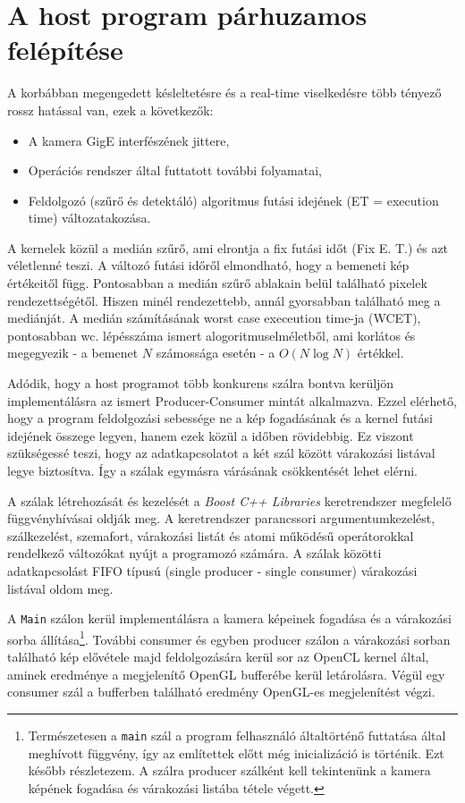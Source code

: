 \section{A host program párhuzamos felépítése} \label{sec:parallel}
	A korbábban megengedett késleltetésre és a real-time viselkedésre több tényező rossz hatással van, ezek a következők:
	\begin{itemize}[noitemsep]
	  \item A kamera GigE interfészének jittere,
	  \item Operációs rendszer által futtatott további folyamatai,
	  \item Feldolgozó (szűrő és detektáló) algoritmus futási idejének (ET = execution time) változatakozása. 
	\end{itemize}
	A kernelek közül a medián szűrő, ami elrontja a fix futási időt (Fix E. T.) és azt véletlenné teszi.
	A változó futási időről elmondható, hogy a bemeneti kép értékeitől függ. Pontosabban a medián szűrő ablakain belül található
	pixelek rendezettségétől. Hiszen minél rendezettebb, annál gyorsabban található meg a mediánját.
	A medián számításának worst case execeution time-ja (WCET), pontosabban wc. lépésszáma ismert alogoritmuselméletből, ami korlátos
	és megegyezik - a bemenet $N$ számossága esetén - a $O(N \log N)$  értékkel.
	
	Adódik, hogy a host programot több konkurens szálra bontva kerüljön implementálásra az ismert Producer-Consumer
	\cite{EWD:EWD329pub} mintát alkalmazva. Ezzel elérhető, hogy a program feldolgozási sebessége ne a kép fogadásának és a kernel
	futási idejének összege legyen, hanem ezek közül a időben rövidebbig.
	Ez viszont szükségessé teszi, hogy az adatkapcsolatot a két szál között várakozási listával legye biztosítva.
	Így a szálak egymásra várásának csökkentését lehet elérni.
	
	A szálak létrehozását és kezelését a \textit{Boost C++ Libraries} \cite{boost} keretrendszer
	megfelelő függvényhívásai oldják meg. A keretrendszer parancssori argumentumkezelést, szálkezelést, szemafort, várakozási
	listát és atomi működésű operátorokkal rendelkező változókat nyújt a programozó számára.
	A szálak közötti adatkapcsolást FIFO típusú (single producer - single consumer) várakozási listával oldom meg.
	
	A \texttt{Main} szálon kerül implementálásra a kamera képeinek fogadása és a várakozási sorba állítása\footnote{Természetesen a
	\texttt{main} szál a program felhasználó általtörténő futtatása által meghívott függvény, így az említettek előtt még inicializáció is történik. Ezt később részletezem. A szálra producer szálként kell tekintenünk a kamera képének fogadása és
	várakozási listába tétele végett.}.
	További consumer és egyben producer szálon a várakozási sorban található kép elővétele majd feldolgozására kerül sor az
	OpenCL kernel által, aminek eredménye a megjelenítő OpenGL bufferébe kerül letárolásra.
	Végül egy consumer szál a bufferben található eredmény OpenGL-es megjelenítést végzi.
	
